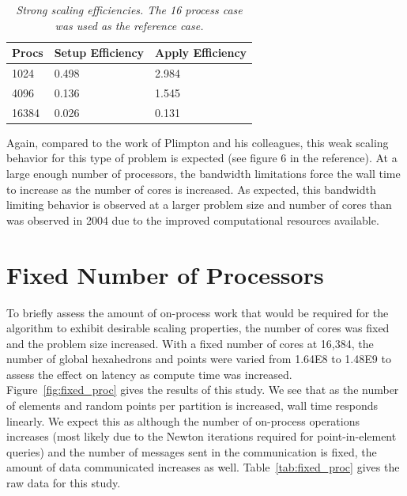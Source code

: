 \documentclass[note]{TechNote}
\begin{document}
\begin{table}[htpb!]
  \begin{center}
    \begin{tabular}{lll}\hline\hline
      \multicolumn{1}{c}{Procs}& 
      \multicolumn{1}{c}{Setup Efficiency} & 
      \multicolumn{1}{c}{Apply Efficiency}\\\hline\hline
      1024 &	0.498 &	2.984 \\
      4096 &	0.136 &	1.545 \\
      16384 &	0.026 &	0.131 \\
      \hline\hline
    \end{tabular}
  \end{center}
  \caption{\sl Strong scaling efficiencies. The 16 process case was used
    as the reference case.}
  \label{tab:strong_efficiency}
\end{table}

Again, compared to the work of Plimpton and his colleagues, this weak
scaling behavior for this type of problem is expected (see figure 6 in
the reference).  At a large enough number of processors, the bandwidth
limitations force the wall time to increase as the number of cores is
increased. As expected, this bandwidth limiting behavior is observed
at a larger problem size and number of cores than was observed in 2004
due to the improved computational resources available.

\section{Fixed Number of Processors}
To briefly assess the amount of on-process work that would be required
for the algorithm to exhibit desirable scaling properties, the number
of cores was fixed and the problem size increased. With a fixed number
of cores at 16,384, the number of global hexahedrons and points were
varied from 1.64E8 to 1.48E9 to assess the effect on latency as
compute time was increased. Figure~\ref{fig:fixed_proc} gives the
results of this study. We see that as the number of elements and
random points per partition is increased, wall time responds
linearly. We expect this as although the number of on-process
operations increases (most likely due to the Newton iterations
required for point-in-element queries) and the number of messages sent
in the communication is fixed, the amount of data communicated
increases as well. Table~\ref{tab:fixed_proc} gives the raw data for
this study.
\end{document}
